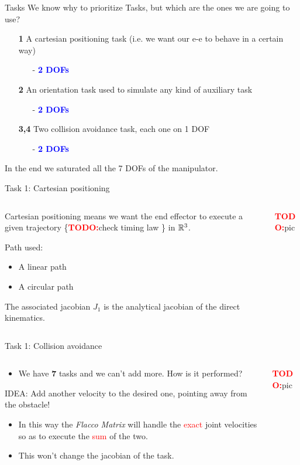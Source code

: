 \documentclass[11pt]{beamer}
\newcommand{\todo}{\textcolor{red}{\textbf{TODO:}}}
\newcommand{\dof}[1]{\begin{itemize}
\item[-]\textcolor{blue}{\textbf{#1 DOFs}}
\end{itemize}}
\begin{document}
\begin{frame}{Tasks}
We know why to prioritize Tasks, but which are the ones we are going to use?
\begin{itemize}
\item[\textbf{1}] A cartesian positioning task (i.e. we want our e-e to behave in a certain way)
\dof{2}
\item[\textbf{2}] An orientation task used to simulate any kind of auxiliary task
\dof{2}
\item[\textbf{3,4}] Two collision avoidance task, each one on 1 DOF
\dof{2}
\end{itemize}
In the end we saturated all the 7 DOFs of the manipulator.
\end{frame}

\begin{frame}{Task 1: Cartesian positioning}
\begin{columns}
\begin{column}{.5\textwidth}
Cartesian positioning means we want the end effector to execute a given trajectory \{\todo check timing law \} in $\Bbb R^3$.

\begin{block}{Path used:}
\begin{itemize}
\item A linear path
\item A circular path 
\end{itemize}
\end{block}

The associated jacobian $J_1$ is the analytical jacobian of the direct kinematics.
\end{column}
\begin{column}{.5\textwidth}
\todo pic
\end{column}
\end{columns}
\end{frame}

\begin{frame}{Task 1: Collision avoidance}
\begin{columns}
\begin{column}{.5\textwidth}
\begin{itemize}
\item We have \textbf{7} tasks and we can't add more. How is it performed?
\end{itemize}
\begin{block}{IDEA:}
Add another velocity to the desired one, pointing away from the obstacle! 
\end{block}
\begin{itemize}
\item In this way the \emph{Flacco Matrix} will handle the \textcolor{red}{exact} joint velocities so as to execute the \textcolor{red}{sum} of the two.
\item This won't change the jacobian of the task.
\end{itemize}
\end{column}
\begin{column}{.5\textwidth}
\todo pic
\end{column}
\end{columns}
\end{frame}
\end{document}
